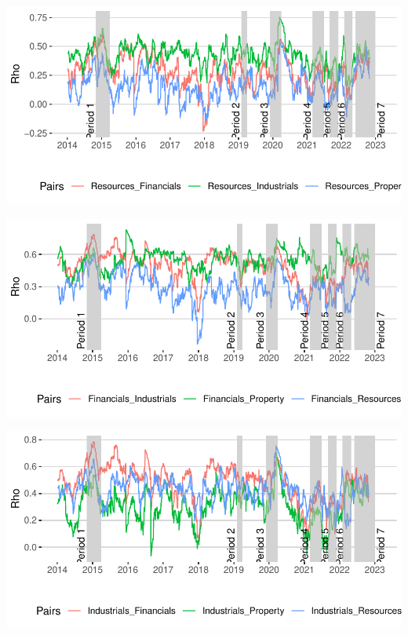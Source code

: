 \documentclass[11pt,preprint, authoryear]{elsarticle}
\let\origfigure\figure
\let\endorigfigure\endfigure
\renewenvironment{figure}[1][2] {
    \expandafter\origfigure\expandafter[H]
} {
    \endorigfigure
}
\numberwithin{equation}{section}
\numberwithin{figure}{section}
\numberwithin{table}{section}
\begin{document}
\begin{figure}[H]

{\centering \includegraphics{Paper_files/figure-latex/DCCfullr-1} 

}

\caption{Dynamic Conditional Correlations: Resources \label{DCCfullr}}\label{fig:DCCfullr}
\end{figure}

\begin{figure}[H]

{\centering \includegraphics{Paper_files/figure-latex/DCCfullf-1} 

}

\caption{Dynamic Conditional Correlations: Financials \label{DCCfullf}}\label{fig:DCCfullf}
\end{figure}

\begin{figure}[H]

{\centering \includegraphics{Paper_files/figure-latex/DCCfulli-1} 

}

\caption{Dynamic Conditional Correlations: Industrials \label{DCCfulli}}\label{fig:DCCfulli}
\end{figure}
\end{document}
